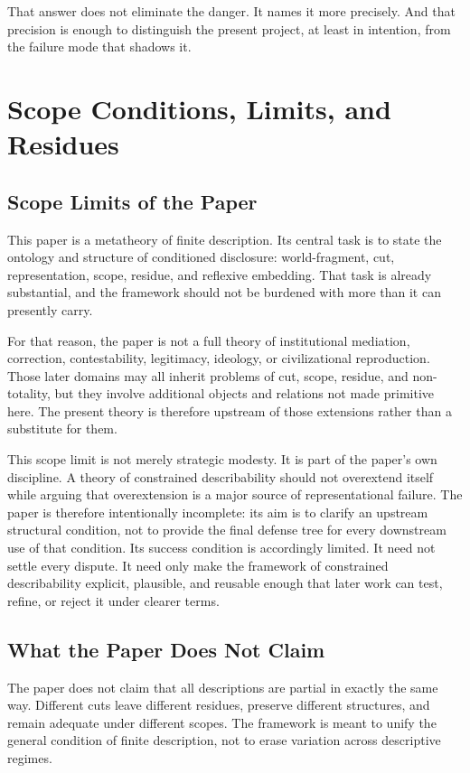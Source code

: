 \documentclass[11pt]{article}
\begin{document}
That answer does not eliminate the danger. It names it more precisely. And that precision is enough to distinguish the present project, at least in intention, from the failure mode that shadows it.
\section{Scope Conditions, Limits, and Residues}

\subsection{Scope Limits of the Paper}

This paper is a metatheory of finite description. Its central task is to state the ontology and structure of conditioned disclosure: world-fragment, cut, representation, scope, residue, and reflexive embedding. That task is already substantial, and the framework should not be burdened with more than it can presently carry.

For that reason, the paper is not a full theory of institutional mediation, correction, contestability, legitimacy, ideology, or civilizational reproduction. Those later domains may all inherit problems of cut, scope, residue, and non-totality, but they involve additional objects and relations not made primitive here. The present theory is therefore upstream of those extensions rather than a substitute for them.

This scope limit is not merely strategic modesty. It is part of the paper's own discipline. A theory of constrained describability should not overextend itself while arguing that overextension is a major source of representational failure. The paper is therefore intentionally incomplete: its aim is to clarify an upstream structural condition, not to provide the final defense tree for every downstream use of that condition. Its success condition is accordingly limited. It need not settle every dispute. It need only make the framework of constrained describability explicit, plausible, and reusable enough that later work can test, refine, or reject it under clearer terms.

\subsection{What the Paper Does Not Claim}

The paper does not claim that all descriptions are partial in exactly the same way. Different cuts leave different residues, preserve different structures, and remain adequate under different scopes. The framework is meant to unify the general condition of finite description, not to erase variation across descriptive regimes.
\end{document}
